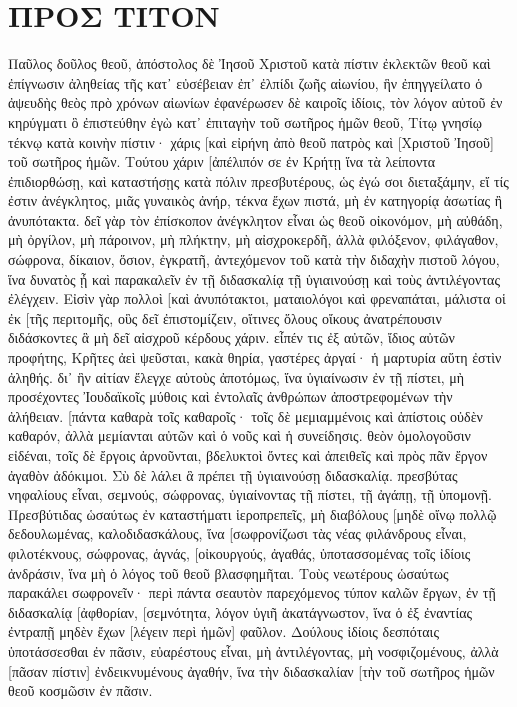 \section{ΠΡΟΣ ΤΙΤΟΝ}
Παῦλος δοῦλος θεοῦ, ἀπόστολος δὲ Ἰησοῦ Χριστοῦ κατὰ πίστιν ἐκλεκτῶν θεοῦ καὶ ἐπίγνωσιν ἀληθείας τῆς κατ᾽ εὐσέβειαν 
ἐπ᾽ ἐλπίδι ζωῆς αἰωνίου, ἣν ἐπηγγείλατο ὁ ἀψευδὴς θεὸς πρὸ χρόνων αἰωνίων 
ἐφανέρωσεν δὲ καιροῖς ἰδίοις, τὸν λόγον αὐτοῦ ἐν κηρύγματι ὃ ἐπιστεύθην ἐγὼ κατ᾽ ἐπιταγὴν τοῦ σωτῆρος ἡμῶν θεοῦ, 
Τίτῳ γνησίῳ τέκνῳ κατὰ κοινὴν πίστιν· χάρις [καὶ εἰρήνη ἀπὸ θεοῦ πατρὸς καὶ [Χριστοῦ Ἰησοῦ] τοῦ σωτῆρος ἡμῶν. 
Τούτου χάριν [ἀπέλιπόν σε ἐν Κρήτῃ ἵνα τὰ λείποντα ἐπιδιορθώσῃ, καὶ καταστήσῃς κατὰ πόλιν πρεσβυτέρους, ὡς ἐγώ σοι διεταξάμην, 
εἴ τίς ἐστιν ἀνέγκλητος, μιᾶς γυναικὸς ἀνήρ, τέκνα ἔχων πιστά, μὴ ἐν κατηγορίᾳ ἀσωτίας ἢ ἀνυπότακτα. 
δεῖ γὰρ τὸν ἐπίσκοπον ἀνέγκλητον εἶναι ὡς θεοῦ οἰκονόμον, μὴ αὐθάδη, μὴ ὀργίλον, μὴ πάροινον, μὴ πλήκτην, μὴ αἰσχροκερδῆ, 
ἀλλὰ φιλόξενον, φιλάγαθον, σώφρονα, δίκαιον, ὅσιον, ἐγκρατῆ, 
ἀντεχόμενον τοῦ κατὰ τὴν διδαχὴν πιστοῦ λόγου, ἵνα δυνατὸς ᾖ καὶ παρακαλεῖν ἐν τῇ διδασκαλίᾳ τῇ ὑγιαινούσῃ καὶ τοὺς ἀντιλέγοντας ἐλέγχειν. 
Εἰσὶν γὰρ πολλοὶ [καὶ ἀνυπότακτοι, ματαιολόγοι καὶ φρεναπάται, μάλιστα οἱ ἐκ [τῆς περιτομῆς, 
οὓς δεῖ ἐπιστομίζειν, οἵτινες ὅλους οἴκους ἀνατρέπουσιν διδάσκοντες ἃ μὴ δεῖ αἰσχροῦ κέρδους χάριν. 
εἶπέν τις ἐξ αὐτῶν, ἴδιος αὐτῶν προφήτης, Κρῆτες ἀεὶ ψεῦσται, κακὰ θηρία, γαστέρες ἀργαί· 
ἡ μαρτυρία αὕτη ἐστὶν ἀληθής. δι᾽ ἣν αἰτίαν ἔλεγχε αὐτοὺς ἀποτόμως, ἵνα ὑγιαίνωσιν ἐν τῇ πίστει, 
μὴ προσέχοντες Ἰουδαϊκοῖς μύθοις καὶ ἐντολαῖς ἀνθρώπων ἀποστρεφομένων τὴν ἀλήθειαν. 
[πάντα καθαρὰ τοῖς καθαροῖς· τοῖς δὲ μεμιαμμένοις καὶ ἀπίστοις οὐδὲν καθαρόν, ἀλλὰ μεμίανται αὐτῶν καὶ ὁ νοῦς καὶ ἡ συνείδησις. 
θεὸν ὁμολογοῦσιν εἰδέναι, τοῖς δὲ ἔργοις ἀρνοῦνται, βδελυκτοὶ ὄντες καὶ ἀπειθεῖς καὶ πρὸς πᾶν ἔργον ἀγαθὸν ἀδόκιμοι. 
Σὺ δὲ λάλει ἃ πρέπει τῇ ὑγιαινούσῃ διδασκαλίᾳ. 
πρεσβύτας νηφαλίους εἶναι, σεμνούς, σώφρονας, ὑγιαίνοντας τῇ πίστει, τῇ ἀγάπῃ, τῇ ὑπομονῇ. 
Πρεσβύτιδας ὡσαύτως ἐν καταστήματι ἱεροπρεπεῖς, μὴ διαβόλους [μηδὲ οἴνῳ πολλῷ δεδουλωμένας, καλοδιδασκάλους, 
ἵνα [σωφρονίζωσι τὰς νέας φιλάνδρους εἶναι, φιλοτέκνους, 
σώφρονας, ἁγνάς, [οἰκουργούς, ἀγαθάς, ὑποτασσομένας τοῖς ἰδίοις ἀνδράσιν, ἵνα μὴ ὁ λόγος τοῦ θεοῦ βλασφημῆται. 
Τοὺς νεωτέρους ὡσαύτως παρακάλει σωφρονεῖν· 
περὶ πάντα σεαυτὸν παρεχόμενος τύπον καλῶν ἔργων, ἐν τῇ διδασκαλίᾳ [ἀφθορίαν, [σεμνότητα, 
λόγον ὑγιῆ ἀκατάγνωστον, ἵνα ὁ ἐξ ἐναντίας ἐντραπῇ μηδὲν ἔχων [λέγειν περὶ ἡμῶν] φαῦλον. 
Δούλους ἰδίοις δεσπόταις ὑποτάσσεσθαι ἐν πᾶσιν, εὐαρέστους εἶναι, μὴ ἀντιλέγοντας, 
μὴ νοσφιζομένους, ἀλλὰ [πᾶσαν πίστιν] ἐνδεικνυμένους ἀγαθήν, ἵνα τὴν διδασκαλίαν [τὴν τοῦ σωτῆρος ἡμῶν θεοῦ κοσμῶσιν ἐν πᾶσιν. 

